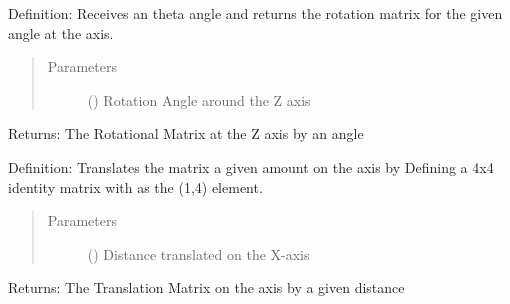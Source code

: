 \documentclass[letterpaper,10pt,english,openany,oneside]{sphinxmanual}
\begin{document}
\begin{fulllineitems}
\begin{fulllineitems}
\label{\detokenize{Forward_Kinematics:Forward_Kinematics.ForwardKinematics.rot_z}}
Definition: Receives an theta angle and returns the rotation matrix for the given angle at the  axis.
\begin{quote}\begin{description}
\item[{Parameters}] \leavevmode
{} () \textendash{} Rotation Angle around the Z axis

\end{description}\end{quote}

Returns: The Rotational Matrix at the Z axis by an  angle

\end{fulllineitems}


\begin{fulllineitems}
\label{\detokenize{Forward_Kinematics:Forward_Kinematics.ForwardKinematics.trans_x}}
Definition: Translates the matrix a given amount  on the  axis by Defining a 4x4 identity
matrix with  as the (1,4) element.
\begin{quote}\begin{description}
\item[{Parameters}] \leavevmode
{} () \textendash{} Distance translated on the X-axis

\end{description}\end{quote}

Returns: The Translation Matrix on the  axis by a given distance

\end{fulllineitems}



\end{fulllineitems}
\end{document}
